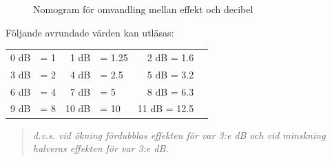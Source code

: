 \begin{figure}
  \caption{Nomogram för omvandling mellan effekt och decibel}
  \label{ellära-nomogram-db-effekt}
\end{figure}

Följande avrundade värden kan utläsas:

\begin{tabular}{rlrlrl}
0 dB & = 1 &  1 dB & =  1.25 & 2 dB = 1.6 \\
3 dB & = 2 &  4 dB & =  2.5  & 5 dB = 3.2 \\
6 dB & = 4 &  7 dB & =  5    & 8 dB = 6.3 \\
9 dB & = 8 & 10 dB & = 10    & 11 dB = 12.5
\end{tabular}

\begin{quote}\emph{
d.v.s. vid ökning fördubblas effekten för var 3:e dB och vid minskning
halveras effekten för var 3:e dB.
}\end{quote}

